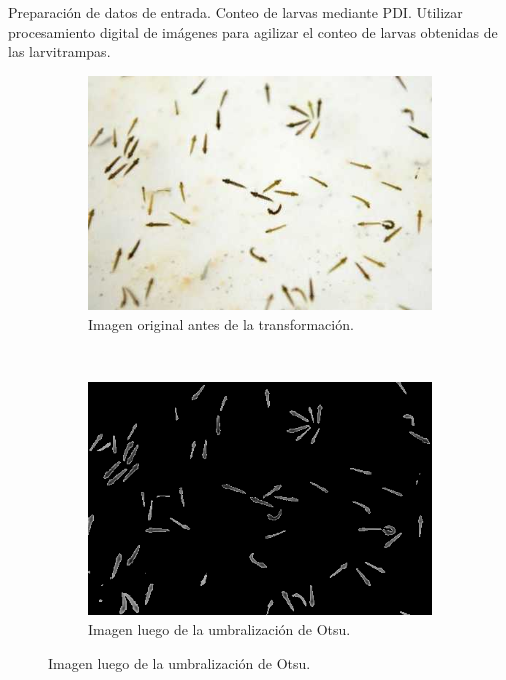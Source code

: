 \begin{frame}[c]{Preparación de datos de entrada. Conteo de larvas mediante PDI.}
Utilizar procesamiento digital de imágenes para agilizar el conteo de larvas obtenidas de las larvitrampas.
    \begin{figure}
      \begin{subfigure}[b]{0.4\textwidth}
          \includegraphics[width=\textwidth]{../book/capitulo-5/graphics/larvas-original.png}
          \caption{Imagen original antes de la transformación.}
      \end{subfigure}
      ~~~~
      \begin{subfigure}[b]{0.4\textwidth}
          \includegraphics[width=\textwidth]{../book/capitulo-5/graphics/larvas-otsu.png}
          \caption{Imagen luego de la umbralización de Otsu.}
      \end{subfigure}
    \end{figure}
\end{frame}

